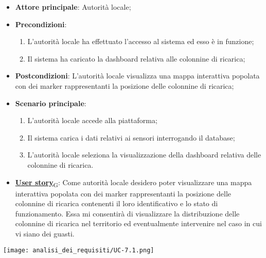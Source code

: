 \begin{itemize}
	\item \textbf{Attore principale}: Autorità locale;
	\item \textbf{Precondizioni}:
	      \begin{enumerate}
		      \item L'autorità locale ha effettuato l'accesso al sistema ed esso è in funzione;
		      \item Il sistema ha caricato la dashboard relativa alle colonnine di ricarica;
	      \end{enumerate}
	\item \textbf{Postcondizioni}: L'autorità locale visualizza una mappa interattiva popolata con dei marker rappresentanti la posizione delle colonnine di ricarica;
	\item \textbf{Scenario principale}:
	      \begin{enumerate}
		      \item L'autorità locale accede alla piattaforma;
		      \item Il sistema carica i dati relativi ai sensori interrogando il database;
		      \item L'autorità locale seleziona la visualizzazione della dashboard relativa delle colonnine di ricarica.
	      \end{enumerate}
	\item \href{https://7last.github.io/docs/rtb/documentazione-interna/glossario\#user-story}{\textbf{User story}\textsubscript{G}}:
	      Come autorità locale desidero poter visualizzare una mappa interattiva popolata con dei marker rappresentanti la posizione delle colonnine di ricarica
	      contenenti il loro identificativo e lo stato di funzionamento. Essa mi consentirà di visualizzare la distribuzione delle colonnine di ricarica nel territorio
	      ed eventualmente intervenire nel caso in cui vi siano dei guasti.
\end{itemize}
\begin{center}
	\texttt{[image: analisi\_dei\_requisiti/UC-7.1.png]}
\end{center}

